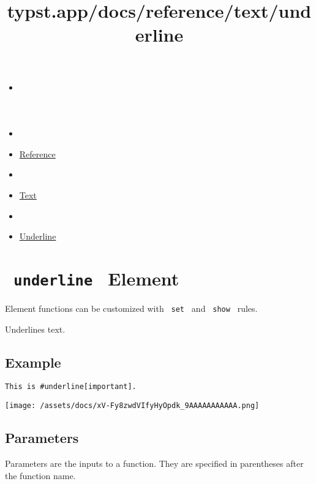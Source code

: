 \title{typst.app/docs/reference/text/underline}

\begin{itemize}
\tightlist
\item
  \href{/docs}{}
\item
  
\item
  \href{/docs/reference/}{Reference}
\item
  
\item
  \href{/docs/reference/text/}{Text}
\item
  
\item
  \href{/docs/reference/text/underline/}{Underline}
\end{itemize}

\section{\texorpdfstring{\texttt{\ underline\ } {{ Element
}}}{ underline   Element }}\label{summary}

\label{element-tooltip}
Element functions can be customized with \texttt{\ set\ } and
\texttt{\ show\ } rules.

Underlines text.

\subsection{Example}\label{example}

\begin{verbatim}
This is #underline[important].
\end{verbatim}

\texttt{[image: /assets/docs/xV-Fy8zwdVIfyHyOpdk\_9AAAAAAAAAAA.png]}

\subsection{\texorpdfstring{{ Parameters
}}{ Parameters }}\label{parameters}

\label{parameters-tooltip}
Parameters are the inputs to a function. They are specified in
parentheses after the function name.

